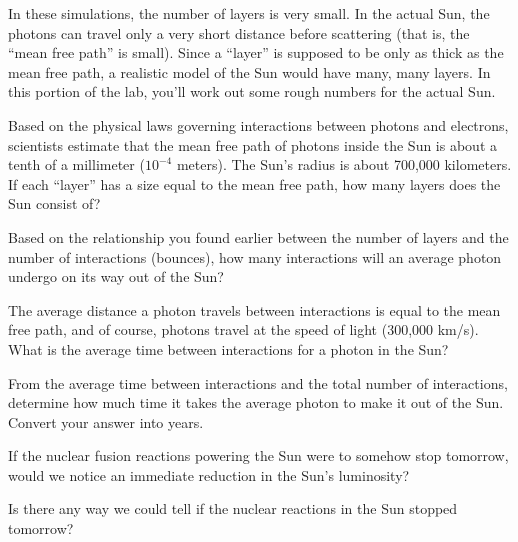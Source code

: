 In these simulations, the number of layers is very small.  In the actual
Sun, the photons can travel only a very short distance before
scattering (that is, the ``mean free path'' is small).  Since a ``layer''
is supposed to be only as thick as the mean
free path, a realistic model of the Sun would have many, many layers.
In this portion of the lab, you'll work out some rough numbers for
the actual Sun.

Based on the physical laws governing interactions between photons
and electrons, scientists estimate that the mean free path
of photons inside the Sun is about a tenth of a millimeter ($10^{-4}$ meters).
The Sun's radius is about 700,000 kilometers.  If
each ``layer'' has a size equal to the mean free path, how many layers
does the Sun consist of?

\answerspace{1in}

Based on the relationship you found earlier between the number of layers
and the number of interactions (bounces), how many interactions
will an
average photon undergo on its way out of the Sun?

\answerspace{1in}

The average distance a photon travels between interactions
is equal to the mean free path, and of course, photons travel at the
speed of light (300,000 km/s).  What is the average time between
interactions for a photon in the Sun?

\answerspace{1in}

From the average time between interactions and the total number of
interactions, determine how much time it takes the average photon to
make it out of the Sun.  Convert your answer into years.

\answerspace{1.5in}

If the nuclear fusion reactions powering the Sun were to somehow stop
tomorrow, would we notice an immediate reduction in the Sun's
luminosity?

\answerspace{1in}

Is there any way we could tell if the nuclear reactions in the Sun
stopped tomorrow?


